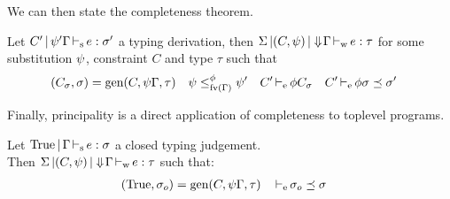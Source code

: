 We can then state the completeness theorem.

\begin{theorem}[Completeness]
  Let $C' \operatorname{|} \mathrm{\psi}'\Gamma \operatorname{\vdash_s} e : \sigma'$ a typing derivation,
  then $\Sigma \operatorname{|} (C,\mathrm{\psi}) \operatorname{|} \Downarrow\!\Gamma \operatorname{\vdash_w} e : \tau$
  for some substitution $\mathrm{\psi}$, constraint $C$ and type $\tau$ such
  that
  \begin{align*}
    (C_\sigma,\sigma) &= \operatorname{\text{gen}}(C,\mathrm{\psi}\Gamma,\tau)
    &\mathrm{\psi} &\leq^{\phi}_{\operatorname{fv}(\Gamma)} \mathrm{\psi}'
    &C'& \operatorname{\vdash_e} \phi C_\sigma
    &C'& \operatorname{\vdash_e} \phi \sigma \preceq \sigma'
  \end{align*}
\end{theorem}

Finally, principality is a direct application of completeness to
toplevel programs.

\begin{corollary}[Principality]
  Let $\operatorname{True} \operatorname{|} \Gamma \operatorname{\vdash_s} e : \sigma$ a closed typing judgement.\\
  Then $\Sigma \operatorname{|} (C,\mathrm{\psi}) \operatorname{|} \Downarrow\!\Gamma \operatorname{\vdash_w} e : \tau$
  such that:
  \begin{align*}
    (\operatorname{True},\sigma_o) &= \operatorname{\text{gen}}(C,\mathrm{\psi}\Gamma,\tau)
    && \operatorname{\vdash_e} \sigma_o \preceq \sigma
  \end{align*}

  
\end{corollary}

